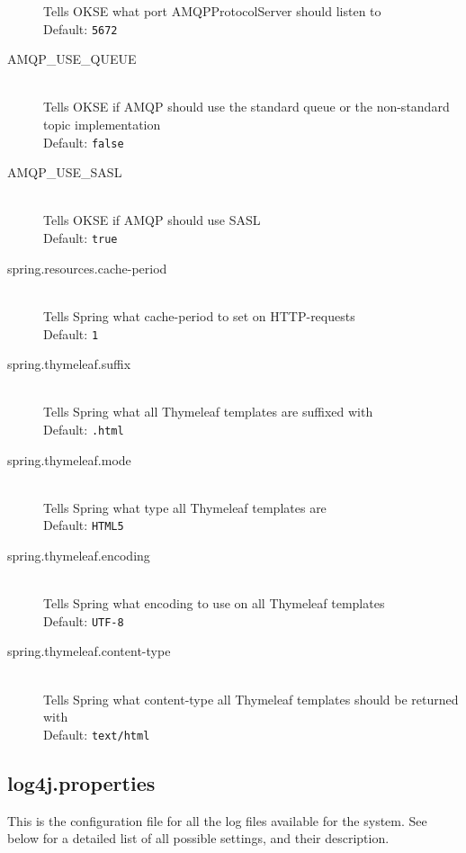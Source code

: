 \begin{description}
  Tells OKSE what port AMQPProtocolServer should listen to \hfill \\ Default: \verb!5672!
  \item[AMQP\_USE\_QUEUE] \hfill \\
  Tells OKSE if AMQP should use the standard queue or the non-standard topic implementation \hfill \\ Default: \verb!false!
  \item[AMQP\_USE\_SASL] \hfill \\
  Tells OKSE if AMQP should use SASL \hfill \\ Default: \verb!true!
  \item[spring.resources.cache-period] \hfill \\
  Tells Spring what cache-period to set on HTTP-requests \hfill \\ Default: \verb!1!
  \item[spring.thymeleaf.suffix] \hfill \\
  Tells Spring what all Thymeleaf templates are suffixed with \hfill \\ Default: \verb!.html! 
   \item[spring.thymeleaf.mode] \hfill \\
  Tells Spring what type all Thymeleaf templates are \hfill \\ Default: \verb!HTML5!
   \item[spring.thymeleaf.encoding] \hfill \\
  Tells Spring what encoding to use on all Thymeleaf templates \hfill \\ Default: \verb!UTF-8!
   \item[spring.thymeleaf.content-type] \hfill \\
  Tells Spring what content-type all Thymeleaf templates should be returned with \hfill \\ Default: \verb!text/html! 
\end{description}
  
 \subsection{log4j.properties}
 \label{subsec:log4j.properties}
 
This is the configuration file for all the log files available for the system. See below for a detailed list of all possible settings, and their description.

